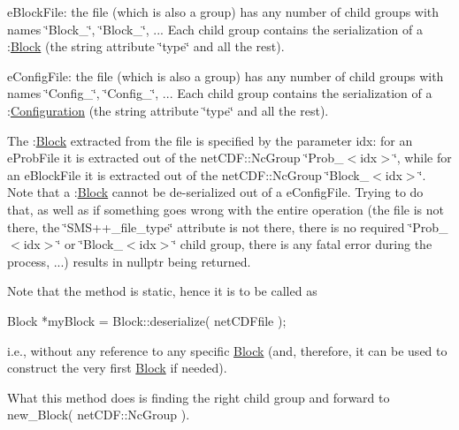 \begin{DoxyItemize}
\item e\+Block\+File\+: the file (which is also a group) has any number of child groups with names \char`\"{}\+Block\+\_\char`\"{}, \char`\"{}\+Block\+\_\char`\"{}, ... Each child group contains the serialization of a \+:\mbox{\hyperlink{class_s_m_spp__di__unipi__it_1_1_block}{Block}} (the string attribute \char`\"{}type\char`\"{} and all the rest).
\item e\+Config\+File\+: the file (which is also a group) has any number of child groups with names \char`\"{}\+Config\+\_\char`\"{}, \char`\"{}\+Config\+\_\char`\"{}, ... Each child group contains the serialization of a \+:\mbox{\hyperlink{class_s_m_spp__di__unipi__it_1_1_configuration}{Configuration}} (the string attribute \char`\"{}type\char`\"{} and all the rest).
\end{DoxyItemize}

The \+:\mbox{\hyperlink{class_s_m_spp__di__unipi__it_1_1_block}{Block}} extracted from the file is specified by the parameter idx\+: for an e\+Prob\+File it is extracted out of the net\+C\+D\+F\+::\+Nc\+Group \char`\"{}\+Prob\+\_\+$<$idx$>$\char`\"{}, while for an e\+Block\+File it is extracted out of the net\+C\+D\+F\+::\+Nc\+Group \char`\"{}\+Block\+\_\+$<$idx$>$\char`\"{}. Note that a \+:\mbox{\hyperlink{class_s_m_spp__di__unipi__it_1_1_block}{Block}} cannot be de-\/serialized out of a e\+Config\+File. Trying to do that, as well as if something goes wrong with the entire operation (the file is not there, the \char`\"{}\+S\+M\+S++\+\_\+file\+\_\+type\char`\"{} attribute is not there, there is no required \char`\"{}\+Prob\+\_\+$<$idx$>$\char`\"{} or \char`\"{}\+Block\+\_\+$<$idx$>$\char`\"{} child group, there is any fatal error during the process, ...) results in nullptr being returned.

Note that the method is static, hence it is to be called as \begin{DoxyVerb}  Block *myBlock = Block::deserialize( netCDFfile );
\end{DoxyVerb}


i.\+e., without any reference to any specific \mbox{\hyperlink{class_s_m_spp__di__unipi__it_1_1_block}{Block}} (and, therefore, it can be used to construct the very first \mbox{\hyperlink{class_s_m_spp__di__unipi__it_1_1_block}{Block}} if needed).

What this method does is finding the right child group and forward to new\+\_\+\+Block( net\+C\+D\+F\+::\+Nc\+Group ). \mbox{\label{class_s_m_spp__di__unipi__it_1_1_block_a4b98fbc561cffa3e92a2690c831ab3c9}} 

